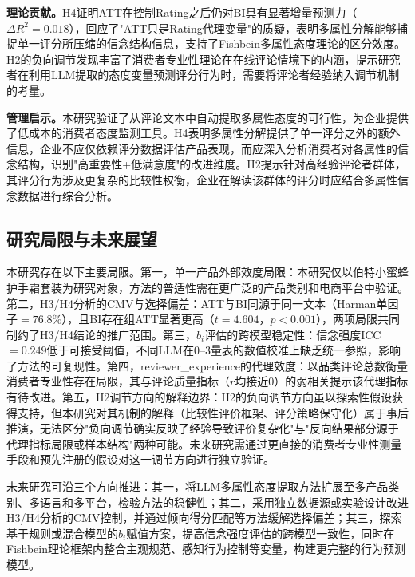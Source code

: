 \textbf{理论贡献。}H4证明ATT在控制Rating之后仍对BI具有显著增量预测力（$\Delta R^2=0.018$），回应了"ATT只是Rating代理变量"的质疑，表明多属性分解能够捕捉单一评分所压缩的信念结构信息，支持了Fishbein多属性态度理论\cite{fishbein1975}的区分效度。H2的负向调节发现丰富了消费者专业性理论\cite{mitchell2022}在在线评论情境下的内涵，提示研究者在利用LLM提取的态度变量预测评分行为时，需要将评论者经验纳入调节机制的考量。

\textbf{管理启示。}本研究验证了从评论文本中自动提取多属性态度的可行性，为企业提供了低成本的消费者态度监测工具。H4表明多属性分解提供了单一评分之外的额外信息，企业不应仅依赖评分数据评估产品表现，而应深入分析消费者对各属性的信念结构，识别"高重要性+低满意度"的改进维度。H2提示针对高经验评论者群体，其评分行为涉及更复杂的比较性权衡，企业在解读该群体的评分时应结合多属性信念数据进行综合分析。

\subsection{研究局限与未来展望}

本研究存在以下主要局限。第一，单一产品外部效度局限：本研究仅以伯特小蜜蜂护手霜套装为研究对象，方法的普适性需在更广泛的产品类别和电商平台中验证。第二，H3/H4分析的CMV与选择偏差：ATT与BI同源于同一文本（Harman单因子$=76.8\%$），且BI存在组ATT显著更高（$t=4.604$，$p<0.001$），两项局限共同制约了H3/H4结论的推广范围。第三，$b_i$评估的跨模型稳定性：信念强度ICC$=0.249$低于可接受阈值，不同LLM在0--3量表的数值校准上缺乏统一参照，影响了方法的可复现性。第四，reviewer\_experience的代理效度：以品类评论总数衡量消费者专业性存在局限，其与评论质量指标（$r$均接近0）的弱相关提示该代理指标有待改进。第五，H2调节方向的解释边界：H2的负向调节方向虽以探索性假设获得支持，但本研究对其机制的解释（比较性评价框架、评分策略保守化）属于事后推演，无法区分"负向调节确实反映了经验导致评价复杂化"与"反向结果部分源于代理指标局限或样本结构"两种可能。未来研究需通过更直接的消费者专业性测量手段和预先注册的假设对这一调节方向进行独立验证。

未来研究可沿三个方向推进：其一，将LLM多属性态度提取方法扩展至多产品类别、多语言和多平台，检验方法的稳健性；其二，采用独立数据源或实验设计改进H3/H4分析的CMV控制，并通过倾向得分匹配等方法缓解选择偏差；其三，探索基于规则或混合模型的$b_i$赋值方案，提高信念强度评估的跨模型一致性，同时在Fishbein理论框架内整合主观规范、感知行为控制等变量，构建更完整的行为预测模型。
